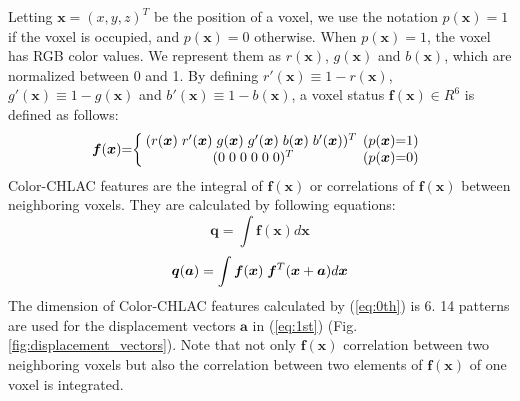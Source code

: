 \documentclass[conference]{sty/IEEEtran}
\begin{document}
Letting $\bm{x}=(x,y,z)^T$ be the position of a voxel,
    we use the notation $p(\bm{x})=1$ if the voxel is occupied, and $p(\bm{x})=0$ otherwise.
When $p(\bm{x})=1$, the voxel has RGB color values.
We represent them as $r(\bm{x})$, $g(\bm{x})$ and $b(\bm{x})$,
    which are normalized between 0 and 1.
By defining $r'(\bm{x}) \equiv 1 - r(\bm{x})$, $g'(\bm{x}) \equiv 1 - g(\bm{x})$ and $b'(\bm{x}) \equiv 1 - b(\bm{x})$,
    a voxel status $\bm{f}(\bm{x})\in R^6$ is defined as follows:
\begin{eqnarray*}
  \label{eq:voxel}
  \bm{f}({\bm x})\hspace{-1mm}=\hspace{-1mm}\left\{
  \begin{array}{cc}
    \hspace{-1mm}
    (r({\bm x})\hspace{1mm} r'({\bm x}) \hspace{1mm}g({\bm x}) \hspace{1mm}g'({\bm x}) \hspace{1mm}b({\bm x}) \hspace{1mm}b'({\bm x}))^T & \hspace{-2mm}(p({\bm x})\hspace{-1mm}=\hspace{-1mm}1) \\
    (0\hspace{1mm}0\hspace{1mm}0\hspace{1mm}0\hspace{1mm}0\hspace{1mm}0)^T & \hspace{-2mm}(p({\bm x})\hspace{-1mm}=\hspace{-1mm}0)
  \end{array}\right.
\end{eqnarray*}
%
Color-CHLAC features are the integral of $\bm{f}(\bm{x})$ or correlations of $\bm{f}(\bm{x})$ between neighboring voxels.
They are calculated by following equations:
\begin{equation}\label{eq:0th}
  {\bm q} = \int \bm{f}({\bm x}) d{\bm x}
\end{equation}
\begin{equation}\label{eq:1st}
  {\bm q}({\bm a}) = \int \bm{f}({\bm x}) \hspace{1mm}\bm{f}^T({\bm x}+{\bm a}) d{\bm x} \\
\end{equation}
%
The dimension of Color-CHLAC features calculated by (\ref{eq:0th}) is 6.
14 patterns are used for the displacement vectors ${\bm a}$ in (\ref{eq:1st}) (Fig. \ref{fig:displacement_vectors}).
Note that not only $\bm{f}(\bm{x})$ correlation between two neighboring voxels
    but also the correlation between two elements of $\bm{f}(\bm{x})$ of one voxel is integrated.
\end{document}
